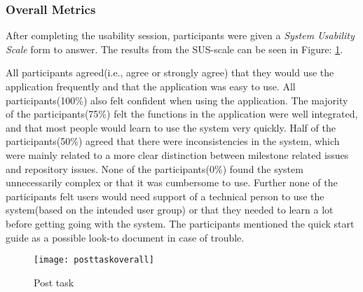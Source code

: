 \subsubsection{Overall Metrics}
After completing the usability session, participants were given a \emph{System Usability Scale} form to answer\citep{brooke1996sus}. The results from the SUS-scale can be seen in Figure: \ref{posttaskoverall}. 

All participants agreed(i.e., agree or strongly agree) that they would use the application frequently and that the application was easy to use. All participants(100\%) also felt confident when using the application. The majority of the participants(75\%) felt the functions in the application were well integrated, and that most people would learn to use the system very quickly. Half of the participants(50\%) agreed that there were inconsistencies in the system, which were mainly related to a more clear distinction between milestone related issues and repository issues. None of the participants(0\%) found the system unnecessarily complex or that it was cumbersome to use. Further none of the participants felt users would need support of a technical person to use the system(based on the intended user group) or that they needed to learn a lot before getting going with the system. The participants mentioned the quick start guide as a possible look-to document in case of trouble.  
\begin{figure}[h!]
    \centering
        \texttt{[image: posttaskoverall]}
    \caption{Post task}
    \label{posttaskoverall}
\end{figure}

